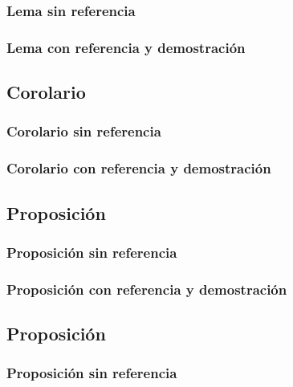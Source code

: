 \subsubsection{Lema sin referencia}
\lem{}{\lipsum[1]}
\subsubsection{Lema con referencia y demostración}
\lemr{}{}{\lipsum[1]}
\begin{lemp}
    \lipsum[1]
\end{lemp}

\subsection{Corolario}
\subsubsection{Corolario sin referencia}
\cor{}{\lipsum[1]}
\subsubsection{Corolario con referencia y demostración}
\corr{}{}{\lipsum[1]}
\begin{corp}
    \lipsum[1]
\end{corp}

\subsection{Proposición}
\subsubsection{Proposición sin referencia}
\prop{}{\lipsum[1]}
\subsubsection{Proposición con referencia y demostración}
\propr{}{}{\lipsum[1]}
\begin{propp}
    \lipsum[1]
\end{propp}

\subsection{Proposición}
\subsubsection{Proposición sin referencia}
\prop{}{\lipsum[1]}
